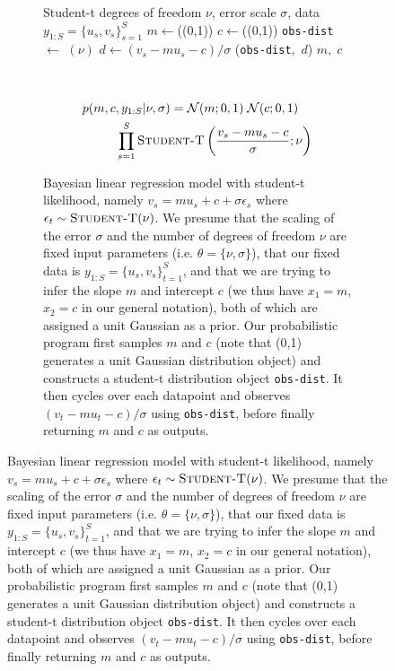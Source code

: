 \begin{figure}[p]
	\centering
	\begin{subfigure}[t]{\textwidth}
		\centering	
		\begin{minipage}[t]{0.48\textwidth}
		\begin{algorithmic}[1]
			\renewcommand{\algorithmicrequire}{\textbf{Inputs:}}
			\renewcommand{\algorithmicensure}{\textbf{Outputs:}}			 
			\Require Student-t degrees of freedom $\nu$, error
			scale $\sigma$, data $y_{1:S} = \{u_s,v_s\}_{s=1}^S$
			\State $m\leftarrow$\sample(\normal(0,1))
			\State $c\leftarrow$\sample(\normal(0,1))
			\State \lstinline$obs-dist$\xspace $\leftarrow$ \studentt $(\nu)$
			\State $d \leftarrow (v_s-m u_s - c)/\sigma$
			\State \observe(\lstinline$obs-dist$\xspace,~$d$)
			\EndFor
			\State \Return $m, \; c$
		\end{algorithmic}
		\end{minipage}
		~~
		\begin{minipage}[t]{0.48\textwidth}
			\vfill
			\resizebox{\textwidth}{!}{
				}
			{\small
			\begin{align*}
			p(m,c&, y_{1:S} | \nu, \sigma)= \mathcal{N}(m;0,1) \; \mathcal{N}(c;0,1) \\
										&\prod_{s=1}^{S} \textsc{Student-T} \left(\frac{v_s-mu_s-c}{\sigma} ; \nu \right)
			\end{align*}}
		\end{minipage}
		\caption{Bayesian linear regression model with student-t likelihood, namely
			$v_s = m u_s + c + \sigma \epsilon_s$ where $\epsilon_t \sim \textsc{Student-T}(\nu)$.
			We presume that the scaling of the error $\sigma$ and the number of degrees of freedom $\nu$
			are fixed input parameters (i.e. $\theta=\{\nu,\sigma\}$), that our fixed data is $y_{1:S} = \{u_s,v_s\}_{t=1}^S$,
		 and that we are trying to infer the slope $m$ and intercept $c$ (we thus have $x_1=m$, $x_2=c$ in our
		 general notation), both of which are assigned a unit Gaussian as a prior.  Our probabilistic program 
			first samples $m$ and $c$ (note that \normal(0,1) generates a unit Gaussian distribution object)
			and constructs a student-t distribution object \lstinline$obs-dist$.  It then cycles
		  over each datapoint and observes $(v_t-m u_t -c)/\sigma$ using \lstinline$obs-dist$,
		  before finally returning $m$ and $c$ as outputs.  
}
\end{subfigure}
\end{figure}
